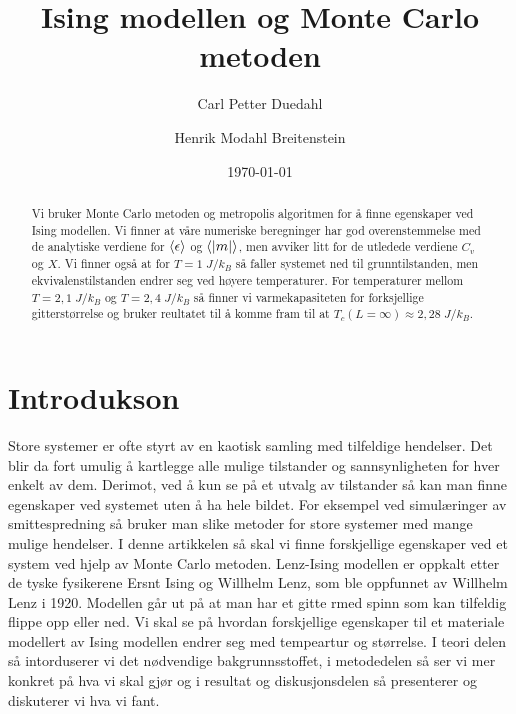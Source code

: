 \documentclass[reprint,english,notitlepage]{revtex4-2}  %
\begin{document}
\title{Ising modellen og Monte Carlo metoden}   %
\author{Carl Petter Duedahl}
\author{Henrik Modahl Breitenstein}               %
\date{\today}                             %
\noaffiliation                            %
\begin{abstract}                          %
Vi bruker Monte Carlo metoden og metropolis algoritmen for å finne egenskaper ved Ising modellen. Vi finner at våre numeriske beregninger har god overenstemmelse med de analytiske verdiene for $\expval{\epsilon}$ og $\expval{|m|}$, men avviker litt for de utledede verdiene $C_v$ og $X$. Vi finner også at for $T = 1 \; J/k_B$ så faller systemet ned til grunntilstanden, men ekvivalenstilstanden endrer seg ved høyere temperaturer. For temperaturer mellom $T = 2,1 \; J/k_B$ og $T = 2,4 \; J/k_B$ så finner vi varmekapasiteten for forksjellige gitterstørrelse og bruker reultatet til å komme fram til at $T_c \left ( L = \infty \right ) \approx 2,28 \; J/k_B$.%
\end{abstract}                            %
\maketitle                                %

\section{Introdukson}

Store systemer er ofte styrt av en kaotisk samling med tilfeldige hendelser. Det blir da fort umulig å kartlegge alle mulige tilstander og sannsynligheten for hver enkelt av dem. Derimot, ved å kun se på et utvalg av tilstander så kan man finne egenskaper ved systemet uten å ha hele bildet. For eksempel ved simulæringer av smittespredning så bruker man slike metoder for store systemer med mange mulige hendelser. I denne artikkelen så skal vi finne forskjellige egenskaper ved et system ved hjelp av Monte Carlo metoden. Lenz-Ising modellen er oppkalt etter de tyske fysikerene Ersnt Ising og Willhelm Lenz, som ble oppfunnet av Willhelm Lenz i 1920. Modellen går ut på at man har et gitte rmed spinn som kan tilfeldig flippe opp eller ned. Vi skal se på hvordan forskjellige egenskaper til et materiale modellert av Ising modellen endrer seg med tempeartur og størrelse. I teori delen så intorduserer vi det nødvendige bakgrunnsstoffet, i metodedelen så ser vi mer konkret på hva vi skal gjør og i resultat og diskusjonsdelen så presenterer og diskuterer vi hva vi fant.
\end{document}
